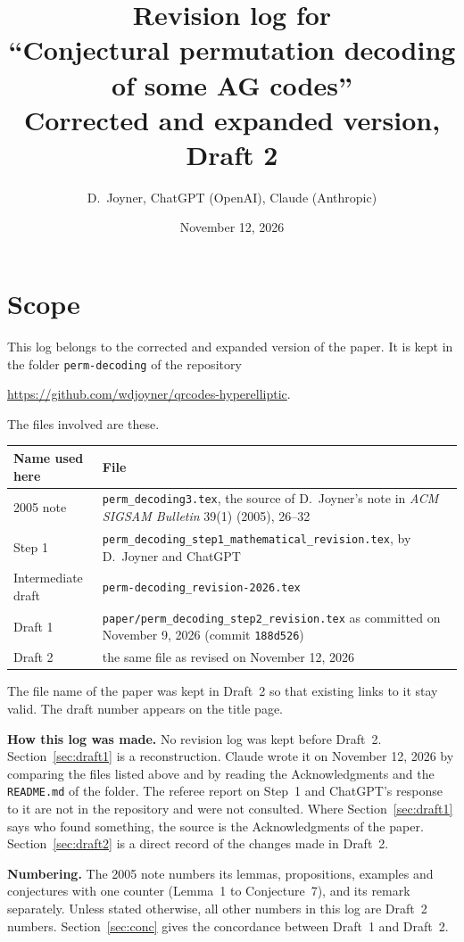 \documentclass[12pt,letterpaper]{article}
\title{Revision log for\\
``Conjectural permutation decoding of some AG codes''\\[4pt]
\large Corrected and expanded version, Draft 2}
\author{D.~Joyner, ChatGPT (OpenAI), Claude (Anthropic)}
\date{November 12, 2026}
\begin{document}
\maketitle

\section*{Scope}
\noindent This log belongs to the corrected and expanded version of the paper.
It is kept in the folder \texttt{perm-decoding} of the repository
\begin{center}
\url{https://github.com/wdjoyner/qrcodes-hyperelliptic}.
\end{center}
The files involved are these.
\begin{center}\small
\begin{tabular}{@{}l>{\raggedright\arraybackslash}p{}@{}}
\toprule
Name used here & File\\
\midrule
2005 note & \texttt{perm\_decoding3.tex}, the source of D.~Joyner's note in
\emph{ACM SIGSAM Bulletin} 39(1) (2005), 26--32\\
Step 1 & \texttt{perm\_decoding\_step1\_mathematical\_revision.tex}, by
D.~Joyner and ChatGPT\\
Intermediate draft & \texttt{perm-decoding\_revision-2026.tex}\\
Draft 1 & \texttt{paper/perm\_decoding\_step2\_revision.tex} as committed on
November 9, 2026 (commit \texttt{188d526})\\
Draft 2 & the same file as revised on November 12, 2026\\
\bottomrule
\end{tabular}
\end{center}
The file name of the paper was kept in Draft~2 so that existing links to it stay
valid. The draft number appears on the title page.

\medskip
\noindent\textbf{How this log was made.} No revision log was kept before
Draft~2. Section~\ref{sec:draft1} is a reconstruction. Claude wrote it on November
12, 2026 by comparing the files listed above and by reading the Acknowledgments and
the \texttt{README.md} of the folder. The referee report on Step~1 and ChatGPT's
response to it are not in the repository and were not consulted. Where
Section~\ref{sec:draft1} says who found something, the source is the
Acknowledgments of the paper. Section~\ref{sec:draft2} is a direct record of the
changes made in Draft~2.

\medskip
\noindent\textbf{Numbering.} The 2005 note numbers its lemmas, propositions,
examples and conjectures with one counter (Lemma~1 to Conjecture~7), and its remark
separately. Unless stated otherwise, all other numbers in this log are Draft~2
numbers. Section~\ref{sec:conc} gives the concordance between Draft~1 and Draft~2.
\end{document}
